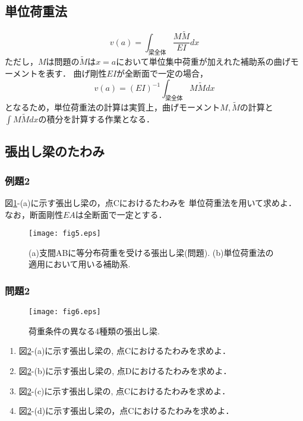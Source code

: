 \documentclass[10pt,a4j]{jarticle}
\begin{document}
\subsection{単位荷重法}
\begin{equation}
	v(a)=\int_{梁全体} \frac{M\tilde M}{EI}dx
	\label{eqn:va}
\end{equation}
ただし，$M$は問題の$\tilde M$は$x=a$において単位集中荷重が加えれた補助系の曲げモーメントを表す．
曲げ剛性$EI$が全断面で一定の場合，
\begin{equation}
	v(a)=(EI)^{-1}\int_{梁全体} M\tilde Mdx
	\label{eqn:va2}
\end{equation}
となるため，単位荷重法の計算は実質上，曲げモーメント$M,\tilde M$の計算と
$\int M\tilde M dx$の積分を計算する作業となる．
\subsection{張出し梁のたわみ}
\subsubsection{例題2}
図\ref{fig:fig2_5}-(a)に示す張出し梁の，点Cにおけるたわみを
単位荷重法を用いて求めよ．なお，断面剛性$EA$は全断面で一定とする．
\begin{figure}[h]
	\begin{center}
	\texttt{[image: fig5.eps]} 
	\end{center}
	\caption{(a)支間ABに等分布荷重を受ける張出し梁(問題).
	 (b)単位荷重法の適用において用いる補助系.} 
	\label{fig:fig2_5}
\end{figure}
\subsubsection{問題2}
\begin{figure}
	\begin{center}
	\texttt{[image: fig6.eps]} 
	\end{center}
	\caption{荷重条件の異なる4種類の張出し梁.} 
	\label{fig:fig2_6}
\end{figure}
\begin{enumerate}
\item
	図\ref{fig:fig2_6}-(a)に示す張出し梁の, 点Cにおけるたわみを求めよ．
\item
	図\ref{fig:fig2_6}-(b)に示す張出し梁の, 点Dにおけるたわみを求めよ．
\item
	図\ref{fig:fig2_6}-(c)に示す張出し梁の, 点Cにおけるたわみを求めよ．
\item
	図\ref{fig:fig2_6}-(d)に示す張出し梁の，点Cにおけるたわみを求めよ．
\end{enumerate}
\end{document}

